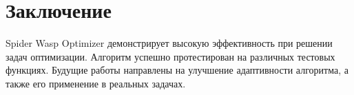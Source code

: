 \documentclass[a4paper,12pt]{article}
\begin{document}
\newpage

\section{Заключение}
Spider Wasp Optimizer демонстрирует высокую эффективность при решении задач оптимизации. Алгоритм успешно протестирован на различных тестовых функциях. Будущие работы направлены на улучшение адаптивности алгоритма, а также его применение в реальных задачах.
\end{document}
